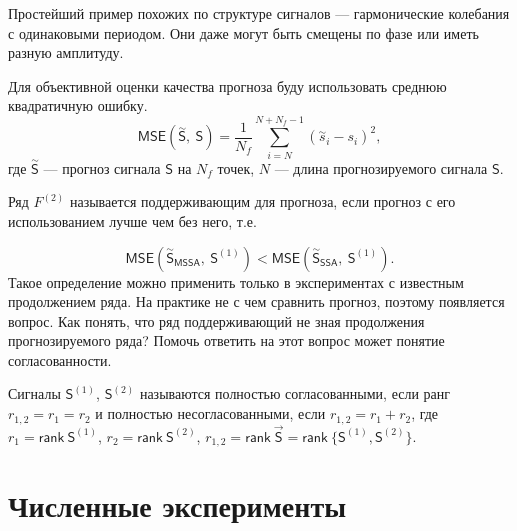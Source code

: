 \documentclass[specialist, substylefile = spbureport.rtx,
    subf,href,colorlinks=true, 12pt]{disser}
\newtheorem*{example}{Пример}
\newcommand{\rank}{\mathsf{rank}\ }
\newcommand{\sfS}{\mathsf{S}}
\newcommand{\MS}{\vec{\sfS}}
\newcommand{\MSE}{\mathsf{MSE}}
\newcommand{\SSA}{\mathsf{SSA}}
\newcommand{\MSSA}{\mathsf{MSSA}}
\begin{document}
        Простейший пример похожих по структуре сигналов --- гармонические колебания с одинаковыми периодом. Они даже могут быть смещены по фазе или иметь разную амплитуду.

        Для объективной оценки качества прогноза буду использовать среднюю квадратичную ошибку.
        $$\mathsf{MSE(\overset{\sim}{S},\ S)} = \frac{1}{N_{f}} \sum_{i = N}^{N + N_{f} - 1} (\overset{\sim}{s}_i - s_i)^2,$$
        где $\overset{\sim}{\sfS}$ --- прогноз сигнала $\sfS$ на $N_{f}$ точек, $N$ --- длина прогнозируемого сигнала $\sfS$.
    

        Ряд $F^{(2)}$ называется поддерживающим для прогноза, если прогноз с его использованием лучше чем без него, т.е.
    
        $$\MSE(\overset{\sim}{\sfS}_{\MSSA},\ \sfS^{(1)}) < \MSE(\overset{\sim}{\sfS}_{\SSA},\ \sfS^{(1)}).$$
        Такое определение можно применить только в экспериментах с известным продолжением ряда. На практике не с чем сравнить прогноз, поэтому появляется вопрос. Как понять, что ряд поддерживающий не зная продолжения прогнозируемого ряда? Помочь ответить на этот вопрос может понятие согласованности.

        Сигналы $\sfS^{(1)}$, $\sfS^{(2)}$ называются полностью согласованными, если ранг $r_{1,2} = r_1 = r_2$ и полностью несогласованными, если $r_{1,2} = r_1 + r_2$, где $r_1 = \rank \sfS^{(1)}$, $r_2 = \rank \sfS^{(2)}$, $r_{1,2} = \rank \MS = \rank \{\sfS^{(1)}, \sfS^{(2)}\}.$



    \chapter{Численные эксперименты}
        
\end{document}
